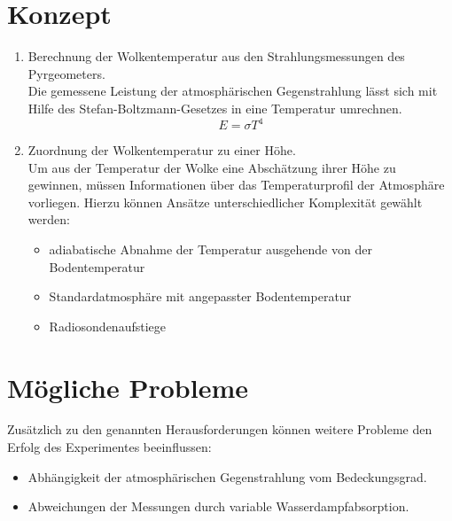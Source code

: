\documentclass[10pt,a4paper,compsoc,peer review papers]{IEEEtran}
\begin{document}
\section{Konzept}\label{sec:konzept}
\begin{enumerate}
  \item Berechnung der Wolkentemperatur aus den Strahlungsmessungen des Pyrgeometers.\\
  Die gemessene Leistung der atmosphärischen Gegenstrahlung lässt sich mit Hilfe des
  Stefan-Boltzmann-Gesetzes in eine Temperatur umrechnen.  
  \[ E = \sigma T^4 \]

  \item Zuordnung der Wolkentemperatur zu einer Höhe.\\
  Um aus der Temperatur der Wolke eine Abschätzung ihrer Höhe zu gewinnen,
  müssen Informationen über das Temperaturprofil der Atmosphäre vorliegen.
  Hierzu können Ansätze unterschiedlicher Komplexität gewählt werden:
  \begin{itemize}
    \item adiabatische Abnahme der Temperatur ausgehende von der Bodentemperatur
    \item Standardatmosphäre mit angepasster Bodentemperatur
    \item Radiosondenaufstiege
  \end{itemize}
\end{enumerate}

\section{Mögliche Probleme}\label{sec:probleme}
Zusätzlich zu den genannten Herausforderungen können weitere Probleme den
Erfolg des Experimentes beeinflussen:
\begin{itemize}
  \item Abhängigkeit der atmosphärischen Gegenstrahlung vom Bedeckungsgrad.
  \item Abweichungen der Messungen durch variable Wasserdampfabsorption.
\end{itemize}
\end{document}
